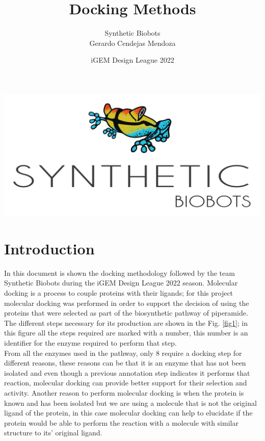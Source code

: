 \documentclass[12pt]{article}
\begin{document}
	
	\title {Docking Methods}
	\date{iGEM Design League 2022}
	\author{Synthetic Biobots\\Gerardo Cendejas Mendoza}
	
	\maketitle

	\begin{center}
		\includegraphics[scale=0.4]{SB.png}
	\end{center}

	\newpage
	
	\section*{Introduction}
	
	In this document is shown the docking methodology followed by the team  Synthetic Biobots during the iGEM Design League 2022 season. Molecular docking is a process to couple proteins with their ligands; for this project molecular docking was performed in order to support the decision of using the proteins that were selected as part of the biosynthetic pathway of piperamide. The different steps necessary for its production are shown in the Fig. \ref{fig1}; in this figure all the steps required are marked with a number, this number is an identifier for the enzyme required to perform that step.\\
	
	From all the enzymes used in the pathway, only 8 require a docking step for different reasons, these reasons can be that it is an enzyme that has not been isolated and even though a previous annotation step indicates it performs that reaction, molecular docking can provide better support for their selection and activity. Another reason to perform molecular docking is when the protein is known and has been isolated but we are using a molecule that is not the original ligand of the protein, in this case molecular docking can help to elucidate if the protein would be able to perform the reaction with a molecule with similar structure to its' original ligand.\\
	
\end{document}
